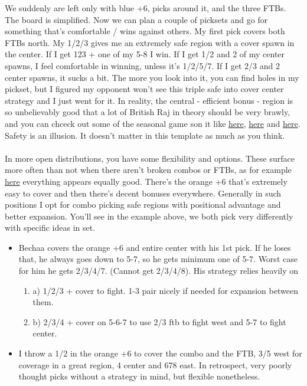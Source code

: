 We suddenly are left only with blue +6, picks around it, and the three FTBs. The board is simplified. Now we can plan a couple of picksets and go for something that's comfortable / wins against others. My first pick covers both FTBs north. My 1/2/3 gives me an extremely safe region with a cover spawn in the center. If I get 123 + one of my 5-8 I win. If I get 1/2 and 2 of my center spawns, I feel comfortable in winning, unless it's 1/2/5/7. If I get 2/3 and 2 center spawns, it sucks a bit. The more you look into it, you can find holes in my pickset, but I figured my opponent won't see this triple safe into cover center strategy and I just went for it. In reality, the central - efficient bonus - region is so unbelievably good that a lot of British Raj in theory should be very brawly, and you can chceck out some of the seasonal game son it like \href{https://www.warzone.com/MultiPlayer?GameID=36358933}{here}, \href{https://www.warzone.com/MultiPlayer?GameID=36442714}{here} and \href{https://www.warzone.com/MultiPlayer?GameID=36276373}{here}. Safety is an illusion. It doesn't matter in this template as much as you think. 
\\
\\
In more open distributions, you have some flexibility and options. These surface more often than not when there aren't broken combos or FTBs, as for example \href{https://www.warzone.com/MultiPlayer?GameID=40619051}{here} everything appears equally good. There's the orange +6 that's extremely easy to cover and then there's decent bonuses everywhere. Generally in such positions I opt for combo picking safe regions with positional advantage and better expansion. You'll see in the example above, we both pick very differently with specific ideas in set. 
\begin{itemize}
    \item Bechaa covers the orange +6 and entire center with his 1st pick. If he loses that, he always goes down to 5-7, so he gets minimum one of 5-7. Worst case for him he gets 2/3/4/7. (Cannot get 2/3/4/8). His strategy relies heavily on 
    \begin{enumerate}
        \item a) 1/2/3 + cover to fight. 1-3 pair nicely if needed for expansion between them.
        \item b) 2/3/4 + cover on 5-6-7 to use 2/3 ftb to fight west and 5-7 to fight center.
    \end{enumerate}
    \item I throw a 1/2 in the orange +6 to cover the combo and the FTB, 3/5 west for coverage in a great region, 4 center and 678 east. In retrospect, very poorly thought picks without a strategy in mind, but flexible nonetheless.
\end{itemize}

